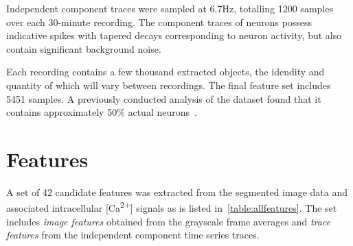 \documentclass[10pt]{article}
\newcommand{\calcium}[0]{Ca\textsuperscript{2+}}
\begin{document}
Independent component traces were sampled at \num{6.7}\si{Hz}, totalling \num{1200} samples over each \num{30}-minute recording. The component traces of neurons possess indicative spikes with tapered decays corresponding to neuron activity, but also contain significant background noise.

Each recording contains a few thousand extracted objects, the idendity and quantity of which will vary between recordings.
The final feature set includes \num{5451} samples.
A previously conducted analysis of the dataset found that it contains approximately 50\% actual neurons~\cite{Kim2011}.

\section{Features}

A set of \num{42} candidate features was extracted from the segmented image data and associated intracellular [\calcium] signals as is listed in~\cref{table:allfeatures}.
The set includes \emph{image features} obtained from the grayscale frame averages and \emph{trace features} from the independent component time series traces.
\end{document}
